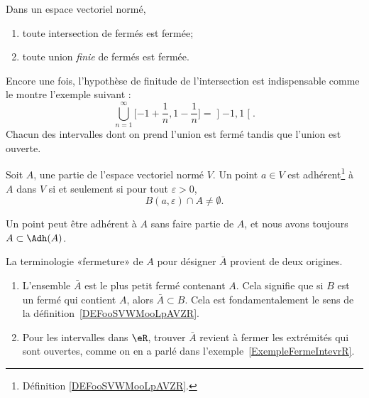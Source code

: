 \begin{proposition}
	Dans un espace vectoriel normé,
	\begin{enumerate}
		\item
		      toute intersection de fermés est fermée;
		\item
		      toute union \emph{finie} de fermés est fermée.
	\end{enumerate}
\end{proposition}
Encore une fois, l'hypothèse de finitude de l'intersection est indispensable comme le montre l'exemple suivant :
\begin{equation}
	\bigcup_{n=1}^{\infty}\mathopen[ -1+\frac{1}{ n } , 1-\frac{1}{ n } \mathclose]=\mathopen] -1 , 1 \mathclose[.
\end{equation}
Chacun des intervalles dont on prend l'union est fermé tandis que l'union est ouverte.

\begin{lemma}       \label{LEMooHPQTooHKdoiL}
	Soit \( A\), une partie de l'espace vectoriel normé \( V\). Un point \( a\in V\) est adhérent\footnote{Définition \ref{DEFooSVWMooLpAVZR}.} à \( A\) dans \( V\) si et seulement si pour tout \( \varepsilon>0\),
	\begin{equation}
		B(a,\varepsilon)\cap A\neq\emptyset.
	\end{equation}
\end{lemma}
Un point peut être adhérent à \( A\) sans faire partie de \( A\), et nous avons toujours \( A\subset\Adh(A)\).

\begin{example}     \label{EXooICLBooJzQFNY}
	La terminologie «fermeture» de \( A\) pour désigner \( \bar A\) provient de deux origines.
	\begin{enumerate}
		\item
		      L'ensemble \( \bar A\) est le plus petit fermé contenant \( A\). Cela signifie que si \( B\) est un fermé qui contient \( A\), alors \( \bar A\subset B\). Cela est fondamentalement le sens de la définition~\ref{DEFooSVWMooLpAVZR}.
		\item
		      Pour les intervalles dans \( \eR\), trouver \( \bar A\) revient à fermer les extrémités qui sont ouvertes, comme on en a parlé dans l'exemple~\ref{ExempleFermeIntevrR}.
	\end{enumerate}
\end{example}

